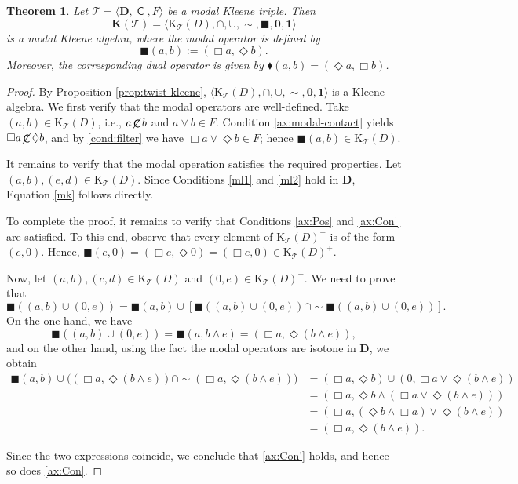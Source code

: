 \documentclass{article}
\newtheorem{theorem}{Theorem}[section]
\DeclareMathOperator{\con}{\mathsf{C}}
\DeclareMathOperator{\notcon}{\cancel{ \con}}
\newcommand{\KC}[1]{\mathrm{K}_\T(#1)}
\newcommand{\one}{\mathbf{1}}
\newcommand{\zero}{\mathbf{0}}
\newcommand{\D}{\mathbf{D}}
\newcommand{\T}{\mathcal{T}}
\newcommand{\boxn}{\blacksquare}
\newcommand{\diamon}{\blacklozenge}
\begin{document}
\begin{theorem}
\label{thm:twist-modal-kleene}
   Let $\T=\langle\D, \con, F\rangle$ be a modal Kleene triple. Then 
   \[\mathbf{K}(\T)=\langle\KC{D}, \cap, \cup, \sim, \boxn, \zero, \one\rangle\] is a modal Kleene algebra, where the modal operator is defined by
   \[
        \boxn(a,b) := (\Box a, \Diamond b).
    \]
    Moreover, the corresponding dual operator is given by $ \diamon(a,b) = (\Diamond a, \Box b)$.
\end{theorem}
\begin{proof}
    By Proposition \ref{prop:twist-kleene}, $\langle\KC{D}, \cap, \cup, \sim, \zero, \one\rangle$ is a Kleene algebra.
   We first verify that the modal operators are well-defined. Take $(a, b) \in \KC{D}$, i.e., $a\notcon b$ and $a\vee b \in F$. Condition \eqref{ax:modal-contact} yields $\Box a\notcon \Diamond b$, and by \eqref{cond:filter} we have $\Box a\vee \Diamond b\in F$; hence $\boxn(a, b) \in \KC{D}$.
   
    It remains to verify that the modal operation satisfies the required properties. Let $(a,b), (e,d) \in \KC{D}$. Since Conditions \eqref{ml1} and \eqref{ml2} hold in $\D$, Equation \eqref{mk} follows directly.
    
    To complete the proof, it remains to verify that Conditions \eqref{ax:Pos} and \eqref{ax:Con'} are satisfied. To this end, observe that every element of $\KC{D}^{+}$ is of the form $(e,0)$. Hence, $\boxn (e,0)= ( \Box e,\Diamond0)=(\Box e,0)\in \KC{D}^{+}.$
 
    Now, let $(a,b), (c,d)\in \KC{D}$ and $(0,e)\in \KC{D}^{-}$. We need to prove that 
     \[
    \boxn ((a,b)\cup (0,e))= \boxn (a,b)\cup [\boxn ((a,b)\cup (0,e))\cap \sim\boxn ((a,b)\cup (0,e))].
    \]
    On the one hand, we have
    \[
    \boxn ((a,b)\cup (0,e))= \boxn(a, b\wedge e)=(\Box a, \Diamond(b \wedge e)),
    \]
    and on the other hand, using the fact the modal operators are isotone in $\D$, we obtain
    \begin{align*}
        \boxn (a,b)\cup \big((\Box a, \Diamond(b \wedge e))\cap \sim(\Box a, \Diamond(b \wedge e))\big)
        &= (\Box a,\Diamond b) \cup (0, \Box a\vee\Diamond(b \wedge e))\\
        &= (\Box a,\Diamond b\wedge(\Box a\vee\Diamond(b \wedge e)))\\
        &= (\Box a,(\Diamond b\wedge\Box a)\vee  \Diamond(b \wedge e))\\
        &= (\Box a, \Diamond(b \wedge e)).
    \end{align*}
    
    Since the two expressions coincide, we conclude that \eqref{ax:Con'} holds, and hence so does \eqref{ax:Con}. 
\end{proof}
\end{document}
